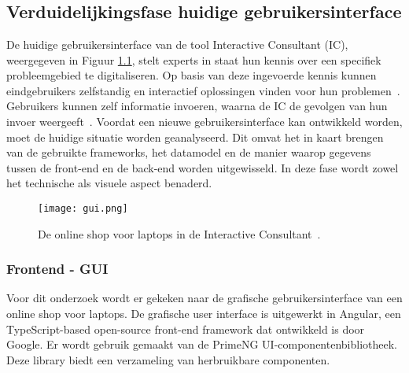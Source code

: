 
\chapter{}%
\label{ch:methodologie}

\section [Verduidelijkingsfase huidige situatie]{Verduidelijkingsfase huidige geb\-ruikersinterface}
De huidige gebruikersinterface van de tool Interactive Consultant (IC), weergegeven in Figuur \ref{fig:gui}, stelt experts in staat hun kennis over een specifiek probleemgebied te digitaliseren. Op basis van deze ingevoerde kennis kunnen eindgebruikers zelfstandig en interactief oplossingen vinden voor hun problemen~\autocite{Carbonnelle2024}. Gebruikers kunnen zelf informatie invoeren, waarna de IC de gevolgen van hun invoer weergeeft~\autocite{DeVogelaere2025}. Voordat een nieuwe gebruikersinterface kan ontwikkeld worden, moet de huidige situatie worden geanalyseerd. Dit omvat het in kaart brengen van de gebruikte frameworks, het datamodel en de manier waarop gegevens tussen de front-end en de back-end worden uitgewisseld. In deze fase wordt zowel het technische als visuele aspect benaderd.

\begin{figure}
    \centering
    \texttt{[image: gui.png]}
    \caption[Huidige gebruikersinterface.]{\label{fig:gui}De online shop voor laptops in de Interactive Consultant~\autocite{KULeuven}.}
\end{figure}

\subsection{Frontend - GUI}
Voor dit onderzoek wordt er gekeken naar de grafische gebruikersinterface van een online shop voor laptops. De grafische user interface is uitgewerkt in Angular, een TypeScript-based open-source front-end framework dat ontwikkeld is door Google. Er wordt gebruik gemaakt van de PrimeNG UI-componentenbibliotheek. Deze library biedt een verzameling van herbruikbare componenten.

